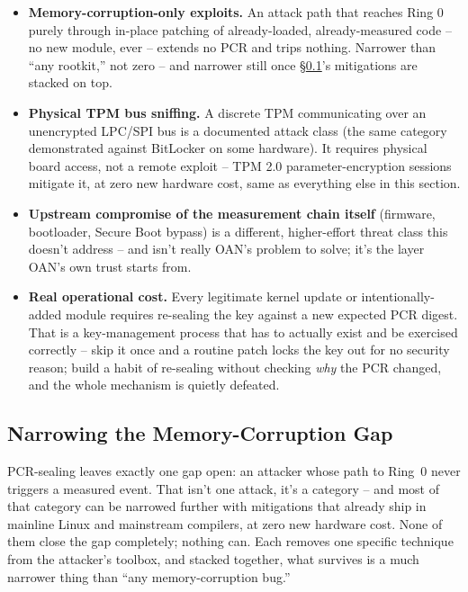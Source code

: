 \documentclass[11pt,a4paper]{article}
\begin{document}
\begin{notebox}
\begin{itemize}
  \item \textbf{Memory-corruption-only exploits.} An attack path that
    reaches Ring 0 purely through in-place patching of already-loaded,
    already-measured code -- no new module, ever -- extends no PCR and
    trips nothing. Narrower than ``any rootkit,'' not zero -- and
    narrower still once \S\ref{sec:memcorr-narrowing}'s mitigations are
    stacked on top.
  \item \textbf{Physical TPM bus sniffing.} A discrete TPM
    communicating over an unencrypted LPC/SPI bus is a documented
    attack class (the same category demonstrated against BitLocker on
    some hardware). It requires physical board access, not a remote
    exploit -- TPM 2.0 parameter-encryption sessions mitigate it, at
    zero new hardware cost, same as everything else in this section.
  \item \textbf{Upstream compromise of the measurement chain itself}
    (firmware, bootloader, Secure Boot bypass) is a different, higher-effort
    threat class this doesn't address -- and isn't really OAN's problem
    to solve; it's the layer OAN's own trust starts from.
  \item \textbf{Real operational cost.} Every legitimate kernel update
    or intentionally-added module requires re-sealing the key against a
    new expected PCR digest. That is a key-management process that has
    to actually exist and be exercised correctly -- skip it once and a
    routine patch locks the key out for no security reason; build a
    habit of re-sealing without checking \emph{why} the PCR changed,
    and the whole mechanism is quietly defeated.
\end{itemize}
\end{notebox}

\subsection{Narrowing the Memory-Corruption Gap}
\label{sec:memcorr-narrowing}

PCR-sealing leaves exactly one gap open: an attacker whose path to
Ring~0 never triggers a measured event. That isn't one attack, it's a
category -- and most of that category can be narrowed further with
mitigations that already ship in mainline Linux and mainstream
compilers, at zero new hardware cost. None of them close the gap
completely; nothing can. Each removes one specific technique from the
attacker's toolbox, and stacked together, what survives is a much
narrower thing than ``any memory-corruption bug.''
\end{document}
